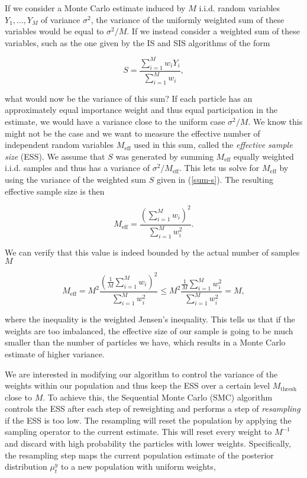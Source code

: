 If we consider a Monte Carlo estimate induced by $M$ i.i.d. random variables $Y_1, \ldots, Y_M$ of variance $\sigma^2$, the variance of the uniformly weighted sum of these variables would be equal to $\sigma^2/M$. If we instead consider a weighted sum of these variables, such as the one given by the IS and SIS algorithms of the form

\begin{equation}\label{sum-s}
  S = \frac{\sum_{i=1}^Mw_iY_i}{\sum_{i=1}^Mw_i},
\end{equation}

what would now be the variance of this sum? If each particle has an approximately equal importance weight and thus equal participation in the estimate, we would have a variance close to the uniform case $\sigma^2/M$. We know this might not be the case and we want to measure the effective number of independent random variables $M_\text{eff}$ used in this sum, called the \textit{effective sample size} (ESS). We assume that $S$ was generated by summing $M_\text{eff}$ equally weighted i.i.d. samples and thus has a variance of $\sigma^2/M_\text{eff}$. This lets us solve for $M_\text{eff}$ by using the variance of the weighted sum $S$ given in (\ref{sum-s}). The resulting effective sample size is then

\begin{equation}\label{ess}
  M_\text{eff} = \frac{\left(\sum_{i=1}^Mw_i\right)^2}{\sum_{i=1}^Mw_i^2}.
\end{equation}

We can verify that this value is indeed bounded by the actual number of samples $M$

\begin{equation*}
  M_\text{eff} = M^2\frac{\left(\frac1M\sum_{i=1}^Mw_i\right)^2}{\sum_{i=1}^Mw_i^2} \le M^2 \frac{\frac1M\sum_{i=1}^Mw_i^2}{\sum_{i=1}^Mw_i^2} = M,
\end{equation*}

where the inequality is the weighted Jensen's inequality. This tells us that if the weights are too imbalanced, the effective size of our sample is going to be much smaller than the number of particles we have, which results in a Monte Carlo estimate of higher variance.

We are interested in modifying our algorithm to control the variance of the weights within our population and thus keep the ESS over a certain level $M_\text{thresh}$ close to $M$. To achieve this, the Sequential Monte Carlo (SMC) algorithm controls the ESS after each step of reweighting and performs a step of \textit{resampling} if the ESS is too low. The resampling will reset the population by applying the sampling operator to the current estimate. This will reset every weight to $M^{-1}$ and discard with high probability the particles with lower weights. Specifically, the resampling step maps the current population estimate of the posterior distribution $\mu^y_t$ to a new population with uniform weights,


